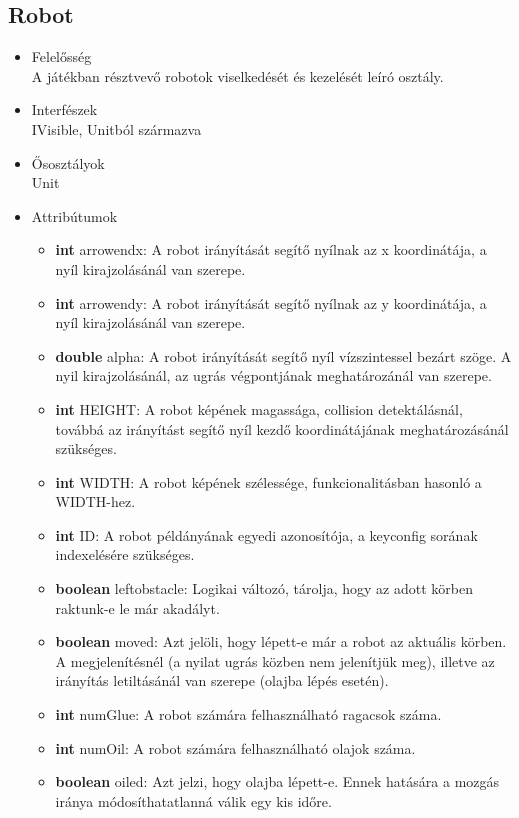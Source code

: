 \subsection{Robot}
\begin{itemize}
\item Felelősség\\
A játékban résztvevő robotok viselkedését és kezelését leíró osztály.
\item Interfészek\\
IVisible, Unitból származva
\item Ősosztályok\\
Unit
\item Attribútumok
	\begin{itemize}
	    \item \textbf{int} arrowendx: A robot irányítását segítő nyílnak az x koordinátája, a nyíl kirajzolásánál van szerepe.
		\item \textbf{int} arrowendy: A robot irányítását segítő nyílnak az y koordinátája, a nyíl kirajzolásánál van szerepe.
		\item \textbf{double} alpha: A robot irányítását segítő nyíl vízszintessel bezárt szöge. A nyil kirajzolásánál, az ugrás végpontjának meghatározánál van szerepe.
		\item \textbf{int} HEIGHT: A robot képének magassága, collision                      detektálásnál, továbbá az irányítást segítő nyíl kezdő koordinátájának                  meghatározásánál szükséges.
		\item \textbf{int} WIDTH: A robot képének szélessége, funkcionalitásban hasonló a WIDTH-hez.
    	\item \textbf{int} ID: A robot példányának egyedi azonosítója, a keyconfig sorának indexelésére szükséges.
    	\item \textbf{boolean} leftobstacle: Logikai változó, tárolja, hogy az adott körben raktunk-e le már akadályt.
    	\item \textbf{boolean} moved: Azt jelöli, hogy lépett-e már a robot az aktuális körben. A megjelenítésnél (a nyilat ugrás közben nem jelenítjük meg), illetve az irányítás letiltásánál van szerepe (olajba lépés esetén).
		\item \textbf{int} numGlue: A robot számára felhasználható ragacsok száma.
	    \item \textbf{int} numOil: A robot számára felhasználható olajok száma.
	    \item \textbf{boolean} oiled: Azt jelzi, hogy olajba lépett-e. Ennek hatására a mozgás iránya módosíthatatlanná válik egy kis időre.

\end{itemize}
\end{itemize}
